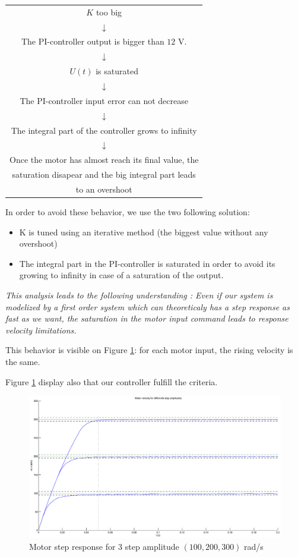 \begin{center}
\begin{tabular}{c}
  $K$ too big \\ 
  $\downarrow$ \\ The PI-controller output is bigger than $12$ V. \\
  $\downarrow$ \\ $U(t)$ is saturated \\
  $\downarrow$ \\ The PI-controller input error can not decrease \\
  $\downarrow$ \\ The integral part of the controller grows to infinity \\
  $\downarrow$ \\ Once the motor has almost reach its final value, the \\saturation disapear and the big integral part leads\\ to an overshoot
\end{tabular}
\end{center}

In order to avoid these behavior, we use the two following solution:
\begin{itemize}
 \item K is tuned using an iterative method (the biggest value without any overshoot)
 \item The integral part in the PI-controller is saturated in order to avoid its growing to infinity in case of a saturation of the output.
\end{itemize}

\emph{This analysis leads to the following understanding : 
Even if our system is modelized by a first order system which can theoreticaly has a step response as fast as we want, 
the saturation in the motor input command leads to response velocity limitations.}

This behavior is visible on Figure \ref{StepPIspeed}: for each motor input, the rising velocity is the same. 

Figure \ref{StepPIspeed} display also that our controller fulfill the criteria.

\begin{center}
\begin{figure}[Ht]
 \includegraphics[width=\linewidth]{fig/StepPIspeed.eps}
 \caption{Motor step response for 3 step amplitude $(100,200,300)$ rad/s}
 \label{StepPIspeed}
\end{figure}
\end{center}


